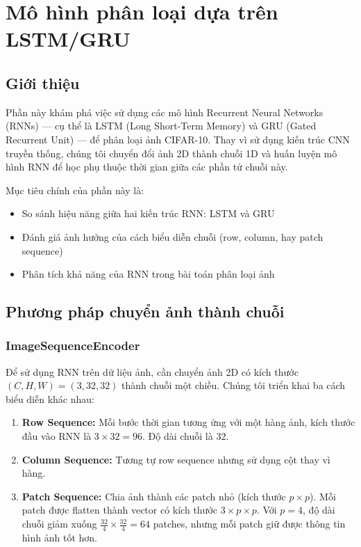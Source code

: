 \section{Mô hình phân loại dựa trên LSTM/GRU}

\subsection{Giới thiệu}

Phần này khám phá việc sử dụng các mô hình Recurrent Neural Networks (RNNs) --- cụ thể là LSTM (Long Short-Term Memory) và GRU (Gated Recurrent Unit) --- để phân loại ảnh CIFAR-10. Thay vì sử dụng kiến trúc CNN truyền thống, chúng tôi chuyển đổi ảnh 2D thành chuỗi 1D và huấn luyện mô hình RNN để học phụ thuộc thời gian giữa các phần tử chuỗi này.

Mục tiêu chính của phần này là:
\begin{itemize}
    \item So sánh hiệu năng giữa hai kiến trúc RNN: LSTM và GRU
    \item Đánh giá ảnh hưởng của cách biểu diễn chuỗi (row, column, hay patch sequence)
    \item Phân tích khả năng của RNN trong bài toán phân loại ảnh
\end{itemize}

\subsection{Phương pháp chuyển ảnh thành chuỗi}

\subsubsection{ImageSequenceEncoder}

Để sử dụng RNN trên dữ liệu ảnh, cần chuyển ảnh 2D có kích thước $(C, H, W) = (3, 32, 32)$ thành chuỗi một chiều. Chúng tôi triển khai ba cách biểu diễn khác nhau:

\begin{enumerate}
    \item \textbf{Row Sequence:} Mỗi bước thời gian tương ứng với một hàng ảnh, kích thước đầu vào RNN là $3 \times 32 = 96$. Độ dài chuỗi là 32.
    
    \item \textbf{Column Sequence:} Tương tự row sequence nhưng sử dụng cột thay vì hàng.
    
    \item \textbf{Patch Sequence:} Chia ảnh thành các patch nhỏ (kích thước $p \times p$). Mỗi patch được flatten thành vector có kích thước $3 \times p \times p$. Với $p = 4$, độ dài chuỗi giảm xuống $\frac{32}{4} \times \frac{32}{4} = 64$ patches, nhưng mỗi patch giữ được thông tin hình ảnh tốt hơn.
\end{enumerate}

